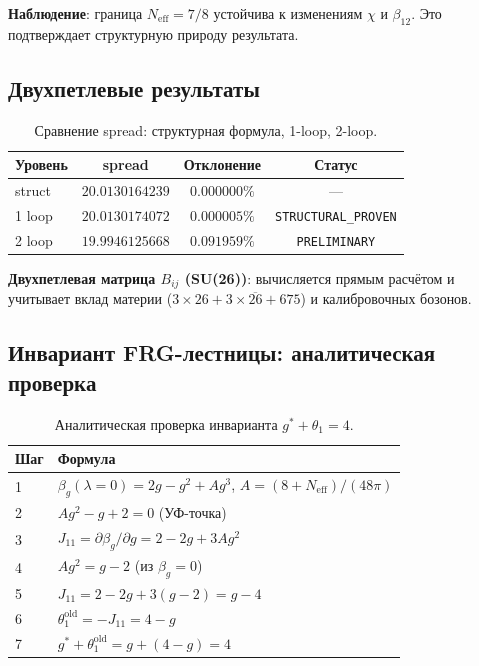 \documentclass[11pt,a4paper]{article}
\theoremstyle{definition}
\begin{document}
\medskip\noindent
\textbf{Наблюдение}: граница $N_{\text{eff}} = 7/8$ устойчива
к изменениям $\chi$ и $\beta_{12}$. Это подтверждает
структурную природу результата.

\subsection{Двухпетлевые результаты}
\label{app:frg-2loop}

\begin{table}[ht]
\centering
\caption{Сравнение spread: структурная формула, 1-loop, 2-loop.}
\label{tab:app-frg-2loop}
\begin{tabular}{lccc}
\toprule
Уровень & spread & Отклонение & Статус \\
\midrule
struct & $20.0130164239$ & $0.000000\%$ & --- \\
1 loop & $20.0130174072$ & $0.000005\%$ & \texttt{STRUCTURAL\_PROVEN} \\
2 loop & $19.9946125668$ & $0.091959\%$ & \texttt{PRELIMINARY} \\
\bottomrule
\end{tabular}
\end{table}

\medskip\noindent
\textbf{Двухпетлевая матрица $B_{ij}$ (SU(26))}: вычисляется
прямым расчётом и учитывает вклад материи ($3 \times 26
+ 3 \times \overline{26} + 675$) и калибровочных бозонов.
\subsection{Инвариант FRG-лестницы: аналитическая проверка}
\label{app:frg-analytical}

\begin{table}[ht]
\centering
\caption{Аналитическая проверка инварианта \texorpdfstring{$g^* + \theta_1 = 4$}{g^* + \_1 = 4}.}
\label{tab:app-frg-analytical}
\begin{tabular}{ll}
\toprule
Шаг & Формула \\
\midrule
1 & $\beta_g(\lambda=0) = 2g - g^2 + A g^3$, $A = (8+N_{\text{eff}})/(48\pi)$ \\
2 & $A g^2 - g + 2 = 0$ (УФ-точка) \\
3 & $J_{11} = \partial \beta_g / \partial g = 2 - 2g + 3A g^2$ \\
4 & $A g^2 = g - 2$ (из $\beta_g = 0$) \\
5 & $J_{11} = 2 - 2g + 3(g-2) = g - 4$ \\
6 & $\theta_1^{\text{old}} = -J_{11} = 4 - g$ \\
7 & $g^* + \theta_1^{\text{old}} = g + (4 - g) = 4$ \\
\bottomrule
\end{tabular}
\end{table}
\end{document}

